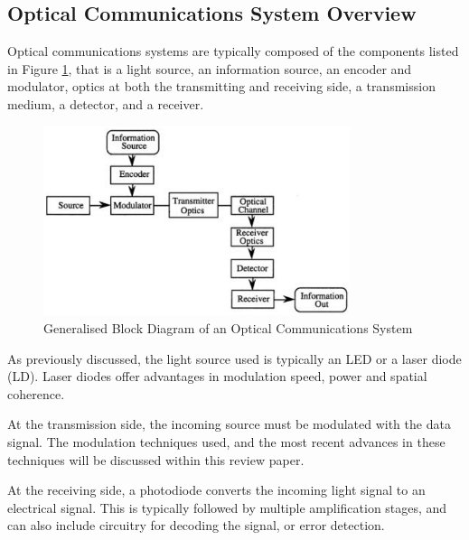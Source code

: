 \subsection{Optical Communications System Overview}

Optical communications systems are typically composed of the components listed
in Figure \ref{fig:overview}, that is a light source, an information source, an
encoder and modulator, optics at both the transmitting and receiving side, a
transmission medium, a detector, and a receiver.

\begin{figure}[H]
	\centering
	\includegraphics[width=0.8\textwidth]{images/optcommsblock}
	\caption{Generalised Block Diagram of an Optical Communications System
	\cite{mickelson_2003}}
	\label{fig:overview}
\end{figure}

\par As previously discussed, the light source used is typically an LED or a laser
diode (LD). Laser diodes offer advantages in modulation speed, power and spatial
coherence\cite{alwayn_2004}.

\par At the transmission side, the incoming source must be modulated with the data
signal. The modulation techniques used, and the most recent advances in these
techniques will be discussed within this review paper.

\par At the receiving side, a photodiode converts the incoming light signal to
an electrical signal. This is typically followed by multiple amplification stages,
and can also include circuitry for decoding the signal, or error
detection\cite{alwayn_2004}.
